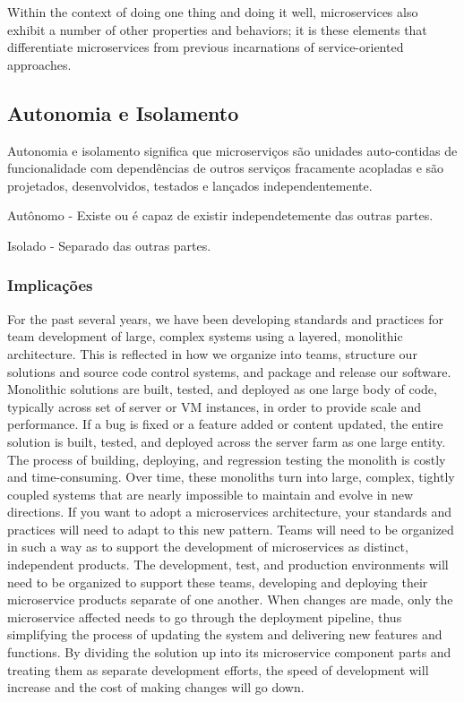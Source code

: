 Within the context of doing one thing and doing it well, microservices also exhibit a number of other properties and behaviors; it is these elements that differentiate microservices from previous incarnations of service-oriented approaches.

\subsection{Autonomia e Isolamento}
Autonomia e isolamento significa que microserviços são unidades auto-contidas de funcionalidade com dependências de outros serviços fracamente acopladas e são projetados, desenvolvidos, testados e lançados independentemente.

Autônomo - Existe ou é capaz de existir independetemente das outras partes.

Isolado - Separado das outras partes. 


\subsubsection*{Implicações}
For the past several years, we have been developing standards and practices for team development of large, complex systems using a layered, monolithic architecture. This is reflected in how we organize into teams, structure our solutions and source code control systems, and package and release our software. Monolithic solutions are built, tested, and deployed as one large body of code, typically across set of server or VM instances, in order to provide scale and performance. If a bug is fixed or a feature added or content updated, the entire solution is built, tested, and deployed across the server farm as one large entity. The process of building, deploying, and regression testing the monolith is costly and time-consuming. Over time, these monoliths turn into large, complex, tightly coupled systems that are nearly impossible to maintain and evolve in new directions. If you want to adopt a microservices architecture, your standards and practices will need to adapt to this new pattern. Teams will need to be organized in such a way as to support the development of microservices as distinct, independent products. The development, test, and production environments will need to be organized to support these teams, developing and deploying their microservice products separate of one another. When changes are made, only the microservice affected needs to go through the deployment pipeline, thus simplifying the process of updating the system and delivering new features and functions. By dividing the solution up into its microservice component parts and treating them as separate development efforts, the speed of development will increase and the cost of making changes will go down.

